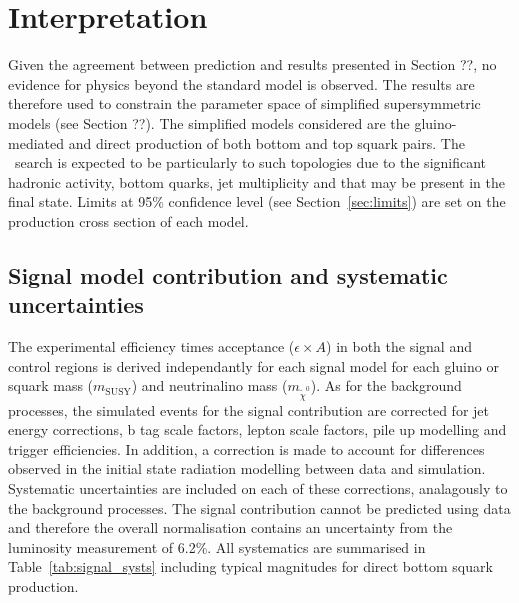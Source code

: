 \clearpage
\section{Interpretation}

Given the agreement between prediction and results presented in Section ??, no evidence
for physics beyond the standard model is observed. The results are therefore used to constrain
the parameter space of simplified supersymmetric models (see Section ??). The simplified 
models considered are the gluino-mediated and direct production of
both bottom and top squark pairs. The \alphat~search is expected to be particularly to
such topologies due to the significant hadronic activity, bottom quarks, jet multiplicity
and \mht that may be present in the final state. Limits at 95\% confidence level (see Section~\ref{sec:limits}) 
are set on the production cross section of each model.

\subsection{Signal model contribution and systematic uncertainties}

The experimental efficiency times acceptance ($\epsilon \times A$) in both the signal and 
control regions is derived independantly for each signal model for each gluino or squark 
mass ($m_{\text{SUSY}}$) and neutrinalino mass ($m_{\tilde{\chi}^{0}}$). As for the 
background processes, the simulated events for the signal contribution are corrected for 
jet energy corrections, b tag scale factors, lepton scale factors, pile up modelling and trigger efficiencies.
In addition, a correction is made to account for differences observed in the initial 
state radiation modelling between data and simulation. Systematic uncertainties are included 
on each of these corrections, analagously to the background processes. The signal contribution
cannot be predicted using data and therefore the overall normalisation contains an uncertainty
from the luminosity measurement of 6.2\%. All systematics are summarised
in Table~\ref{tab:signal_systs} including typical magnitudes for direct bottom squark production.

